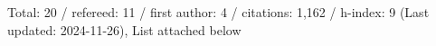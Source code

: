 Total: 20 / refereed: 11 / first author: 4 / citations: 1,162 / h-index: 9 (Last updated: 2024-11-26), List attached below
